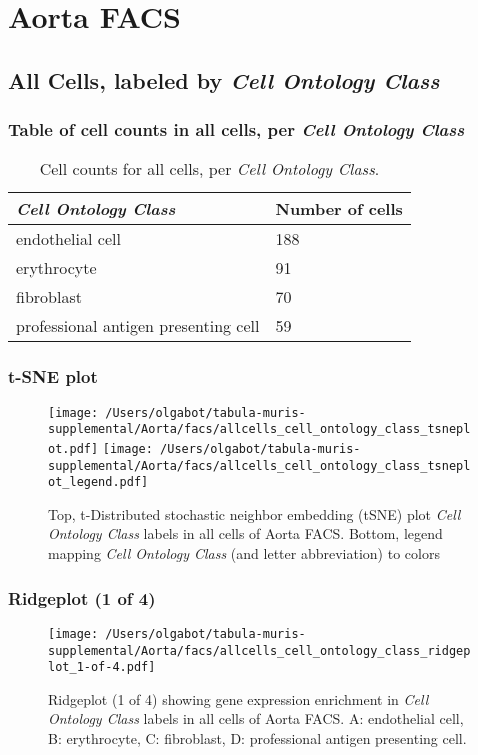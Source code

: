 \clearpage
\section{Aorta FACS}

\subsection{All Cells, labeled by \emph{Cell Ontology Class}}
\subsubsection{Table of cell counts in all cells, per \emph{Cell Ontology Class}}\begin{table}[h]
\centering
\label{my-label}
\begin{tabular}{@{}ll@{}}
\toprule

\emph{Cell Ontology Class}& Number of cells \\ \midrule
endothelial cell & 188 \\

erythrocyte & 91 \\

fibroblast & 70 \\

professional antigen presenting cell & 59 \\
\bottomrule
\end{tabular}
\caption{Cell counts for all cells, per \emph{Cell Ontology Class}.}
\end{table}

\clearpage
\subsubsection{t-SNE plot}
\begin{figure}[h]
\centering
\texttt{[image: /Users/olgabot/tabula-muris-supplemental/Aorta/facs/allcells\_cell\_ontology\_class\_tsneplot.pdf]}
\texttt{[image: /Users/olgabot/tabula-muris-supplemental/Aorta/facs/allcells\_cell\_ontology\_class\_tsneplot\_legend.pdf]}
\caption{Top, t-Distributed stochastic neighbor embedding (tSNE) plot  \emph{Cell Ontology Class} labels in all cells of Aorta FACS. Bottom, legend mapping \emph{Cell Ontology Class} (and letter abbreviation) to colors}
\end{figure}


\clearpage

\subsubsection{Ridgeplot (1 of 4)}
\begin{figure}[h]
\centering
\texttt{[image: /Users/olgabot/tabula-muris-supplemental/Aorta/facs/allcells\_cell\_ontology\_class\_ridgeplot\_1-of-4.pdf]}

\caption{ Ridgeplot (1 of 4)  showing gene expression enrichment in \emph{Cell Ontology Class} labels in all cells of Aorta FACS. A: endothelial cell, B: erythrocyte, C: fibroblast, D: professional antigen presenting cell.}
\end{figure}


